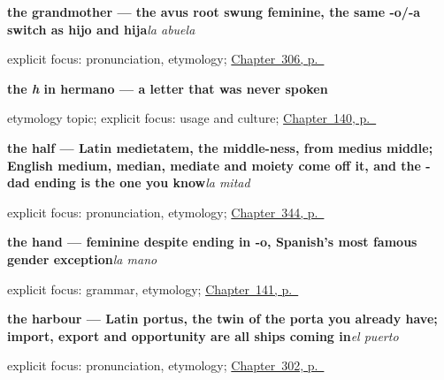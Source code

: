 \noindent\begin{minipage}[t]{\linewidth}
\raggedright
\textbf{the grandmother --- the avus root swung feminine, the same -o/-a switch as hijo and hija}\enspace\emph{la abuela}\par
\footnotesize explicit focus: pronunciation, etymology; \hyperref[ch:hijos-y-abuelos]{Chapter~306, p.~\pageref*{ch:hijos-y-abuelos}}
\end{minipage}\par\smallskip

\noindent\begin{minipage}[t]{\linewidth}
\raggedright
\textbf{the \emph{h} in hermano — a letter that was never spoken}\par
\footnotesize etymology topic; explicit focus: usage and culture; \hyperref[ch:spanish-family]{Chapter~140, p.~\pageref*{ch:spanish-family}}
\end{minipage}\par\smallskip

\noindent\begin{minipage}[t]{\linewidth}
\raggedright
\textbf{the half — Latin medietatem, the middle-ness, from medius middle; English medium, median, mediate and moiety come off it, and the -dad ending is the one you know}\enspace\emph{la mitad}\par
\footnotesize explicit focus: pronunciation, etymology; \hyperref[ch:cero-y-mitad]{Chapter~344, p.~\pageref*{ch:cero-y-mitad}}
\end{minipage}\par\smallskip

\noindent\begin{minipage}[t]{\linewidth}
\raggedright
\textbf{the hand — feminine despite ending in -o, Spanish's most famous gender exception}\enspace\emph{la mano}\par
\footnotesize explicit focus: grammar, etymology; \hyperref[ch:spanish-head-and-hand]{Chapter~141, p.~\pageref*{ch:spanish-head-and-hand}}
\end{minipage}\par\smallskip

\noindent\begin{minipage}[t]{\linewidth}
\raggedright
\textbf{the harbour — Latin portus, the twin of the porta you already have; import, export and opportunity are all ships coming in}\enspace\emph{el puerto}\par
\footnotesize explicit focus: pronunciation, etymology; \hyperref[ch:calle-y-faro]{Chapter~302, p.~\pageref*{ch:calle-y-faro}}
\end{minipage}\par\smallskip


